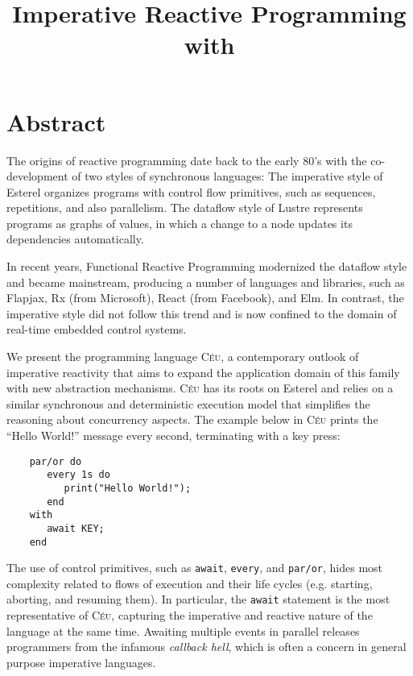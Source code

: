 \documentclass[11pt,a4paper]{article}
\title{
    Imperative Reactive Programming with \CEU
}
\newcommand{\CEU}{\textsc{C\'{e}u}\xspace}
\newcommand{\code}[1] {{\small{\texttt{#1}}}}
\begin{document}
\maketitle


\section{Abstract}
The origins of reactive programming date back to the early 80's with the 
co-development of two styles of synchronous languages:
%
The imperative style of Esterel organizes programs with control flow 
primitives, such as sequences, repetitions, and also parallelism.
%
The dataflow style of Lustre represents programs as graphs of values, in which 
a change to a node updates its dependencies automatically.

In recent years, Functional Reactive Programming modernized the dataflow style 
and became mainstream, producing a number of languages and libraries, such as
Flapjax, Rx (from Microsoft), React (from Facebook), and Elm.
%
In contrast, the imperative style did not follow this trend and is now confined 
to the domain of real-time embedded control systems.

We present the programming language \CEU, a contemporary outlook of imperative 
reactivity that aims to expand the application domain of this family with new 
abstraction mechanisms.
%
\CEU has its roots on Esterel and relies on a similar synchronous and 
deterministic execution model that simplifies the reasoning about concurrency 
aspects.
%
%
The example below in \CEU prints the ``Hello World!'' message every second, 
terminating with a key press:

\begin{verbatim}
    par/or do
       every 1s do
          print("Hello World!");
       end
    with
       await KEY;
    end
\end{verbatim}

The use of control primitives, such as \code{await}, \code{every}, and 
\code{par/or}, hides most complexity related to flows of execution and their 
life cycles (e.g. starting, aborting, and resuming them).
%
In particular, the \code{await} statement is the most representative of \CEU, 
capturing the imperative and reactive nature of the language at the same time.
%
Awaiting multiple events in parallel releases programmers from the infamous 
\emph{callback hell}, which is often a concern in general purpose imperative 
languages.
\end{document}
